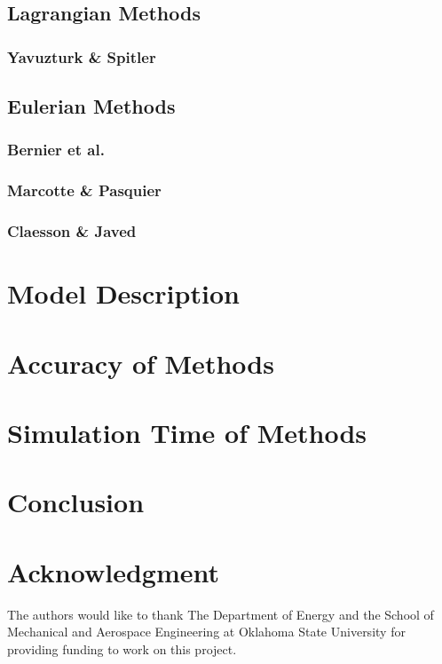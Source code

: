 \documentclass[journal]{../IEEE_Template/IEEEtran}
\begin{document}
\subsection{Lagrangian Methods}

\subsubsection{Yavuzturk \& Spitler}

\subsection{Eulerian Methods}

\subsubsection{Bernier et al.}

\subsubsection{Marcotte \& Pasquier}

\subsubsection{Claesson \& Javed}


\section{Model Description}


\section{Accuracy of Methods}


\section{Simulation Time of Methods}


\section{Conclusion}


\section*{Acknowledgment}


The authors would like to thank The Department of Energy and the School of Mechanical and Aerospace Engineering at Oklahoma State University for providing funding to work on this project.




%
%
%
\end{document}
